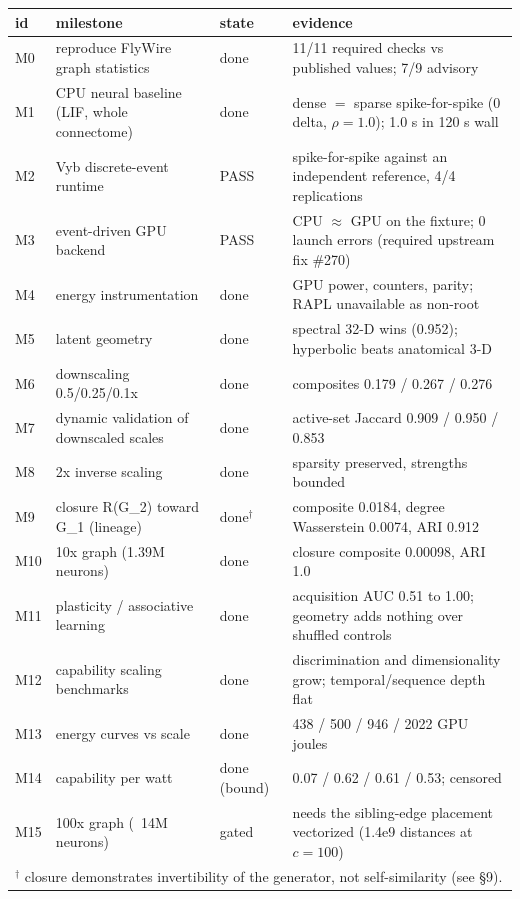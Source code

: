 {\small\setlength{\tabcolsep}{3pt}
\begin{tabular}{l p{5.0cm} l p{6.0cm}}
\toprule
id & milestone & state & evidence \\
\midrule
M0 & reproduce FlyWire graph statistics & done & 11/11 required checks vs published values; 7/9 advisory \\
M1 & CPU neural baseline (LIF, whole connectome) & done & dense $=$ sparse spike-for-spike (0 delta, $\rho=1.0$); 1.0 s in 120 s wall \\
M2 & Vyb discrete-event runtime & PASS & spike-for-spike against an independent reference, 4/4 replications \\
M3 & event-driven GPU backend & PASS & CPU $\approx$ GPU on the fixture; 0 launch errors (required upstream fix \#270) \\
M4 & energy instrumentation & done & GPU power, counters, parity; RAPL unavailable as non-root \\
M5 & latent geometry & done & spectral 32-D wins (0.952); hyperbolic beats anatomical 3-D \\
M6 & downscaling 0.5/0.25/0.1x & done & composites 0.179 / 0.267 / 0.276 \\
M7 & dynamic validation of downscaled scales & done & active-set Jaccard 0.909 / 0.950 / 0.853 \\
M8 & 2x inverse scaling & done & sparsity preserved, strengths bounded \\
M9 & closure R(G\_2) toward G\_1 (lineage) & done$^{\dagger}$ & composite 0.0184, degree Wasserstein 0.0074, ARI 0.912 \\
M10 & 10x graph (1.39M neurons) & done & closure composite 0.00098, ARI 1.0 \\
M11 & plasticity / associative learning & done & acquisition AUC 0.51 to 1.00; geometry adds nothing over shuffled controls \\
M12 & capability scaling benchmarks & done & discrimination and dimensionality grow; temporal/sequence depth flat \\
M13 & energy curves vs scale & done & 438 / 500 / 946 / 2022 GPU joules \\
M14 & capability per watt & done (bound) & 0.07 / 0.62 / 0.61 / 0.53; censored \\
M15 & 100x graph (~14M neurons) & gated & needs the sibling-edge placement vectorized (1.4e9 distances at $c=100$) \\
\midrule
\multicolumn{4}{l}{\footnotesize $^{\dagger}$ closure demonstrates invertibility of the generator, not self-similarity (see \S 9).} \\
\bottomrule
\end{tabular}

}
